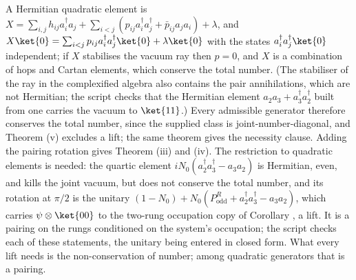 A Hermitian quadratic element is $X = \sum_{i,j} h_{ij}a^{\dagger}_{i}a_{j} + \sum_{i<j} (p_{ij}a^{\dagger}_{i}a^{\dagger}_{j} + \bar{p}_{ij}a_{j}a_{i}) + \lambda$, and $X\ket{0} = \sum_{i<j} p_{ij}a^{\dagger}_{i}a^{\dagger}_{j}\ket{0} + \lambda\ket{0}$ with the states $a^{\dagger}_{i}a^{\dagger}_{j}\ket{0}$ independent; if $X$ stabilises the vacuum ray then $p = 0$, and $X$ is a combination of hops and Cartan elements, which conserve the total number. (The stabiliser of the ray in the complexified algebra also contains the pair annihilations, which are not Hermitian; the script checks that the Hermitian element $a_{2}a_{3} + a^{\dagger}_{3}a^{\dagger}_{2}$ built from one carries the vacuum to $\ket{11}$.) Every admissible generator therefore conserves the total number, since the supplied class is joint-number-diagonal, and Theorem (v) excludes a lift; the same theorem gives the necessity clause. Adding the pairing rotation gives Theorem (iii) and (iv). The restriction to quadratic elements is needed: the quartic element $iN_{0}(a^{\dagger}_{2}a^{\dagger}_{3} - a_{3}a_{2})$ is Hermitian, even, and kills the joint vacuum, but does not conserve the total number, and its rotation at $\pi/2$ is the unitary $(1 - N_{0}) + N_{0}(P^{R}_{\mathrm{odd}} + a^{\dagger}_{2}a^{\dagger}_{3} - a_{3}a_{2})$, which carries $\psi \otimes \ket{00}$ to the two-rung occupation copy of Corollary , a lift. It is a pairing on the rungs conditioned on the system's occupation; the script checks each of these statements, the unitary being entered in closed form. What every lift needs is the non-conservation of number; among quadratic generators that is a pairing.
